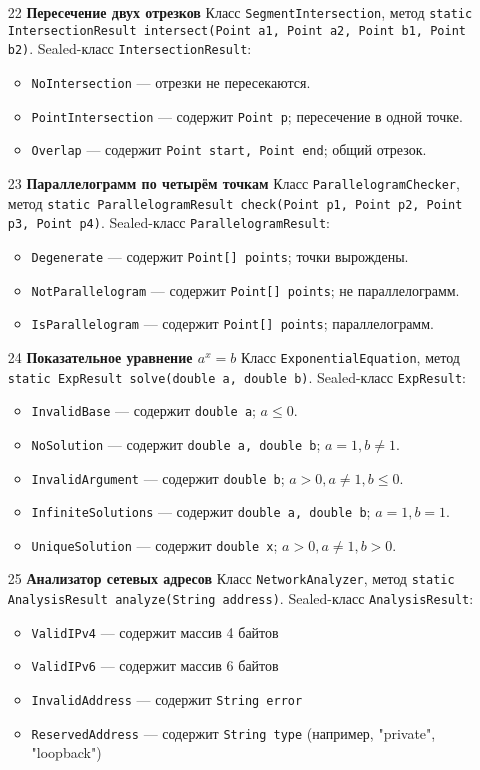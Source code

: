 \documentclass[12pt]{article}
\begin{document}
\begin{enumerate}
\item[22] \textbf{Пересечение двух отрезков}
Класс \texttt{SegmentIntersection}, метод
\texttt{static IntersectionResult intersect(Point a1, Point a2, Point b1, Point b2)}.
Sealed-класс \texttt{IntersectionResult}:
\begin{itemize}
\item \texttt{NoIntersection} — отрезки не пересекаются.
\item \texttt{PointIntersection} — содержит \texttt{Point p}; пересечение в одной точке.
\item \texttt{Overlap} — содержит \texttt{Point start, Point end}; общий отрезок.
\end{itemize}

\item[23] \textbf{Параллелограмм по четырём точкам}
Класс \texttt{ParallelogramChecker}, метод
\texttt{static ParallelogramResult check(Point p1, Point p2, Point p3, Point p4)}.
Sealed-класс \texttt{ParallelogramResult}:
\begin{itemize}
\item \texttt{Degenerate} — содержит \texttt{Point[] points}; точки вырождены.
\item \texttt{NotParallelogram} — содержит \texttt{Point[] points}; не параллелограмм.
\item \texttt{IsParallelogram} — содержит \texttt{Point[] points}; параллелограмм.
\end{itemize}

\item[24] \textbf{Показательное уравнение \(a^x = b\)}
Класс \texttt{ExponentialEquation}, метод
\texttt{static ExpResult solve(double a, double b)}.
Sealed-класс \texttt{ExpResult}:
\begin{itemize}
\item \texttt{InvalidBase} — содержит \texttt{double a}; \(a \leq 0\).
\item \texttt{NoSolution} — содержит \texttt{double a, double b}; \(a = 1, b \neq 1\).
\item \texttt{InvalidArgument} — содержит \texttt{double b}; \(a > 0, a \neq 1, b \leq 0\).
\item \texttt{InfiniteSolutions} — содержит \texttt{double a, double b}; \(a = 1, b = 1\).
\item \texttt{UniqueSolution} — содержит \texttt{double x}; \(a > 0, a \neq 1, b > 0\).
\end{itemize}

\item[25] \textbf{Анализатор сетевых адресов}
Класс \texttt{NetworkAnalyzer}, метод
\texttt{static AnalysisResult analyze(String address)}.
Sealed-класс \texttt{AnalysisResult}:
\begin{itemize}
\item \texttt{ValidIPv4} — содержит массив 4 байтов
\item \texttt{ValidIPv6} — содержит массив 6 байтов
\item \texttt{InvalidAddress} — содержит \texttt{String error}
\item \texttt{ReservedAddress} — содержит \texttt{String type} (например, "private", "loopback")
\end{itemize}
\end{enumerate}
\end{document}
